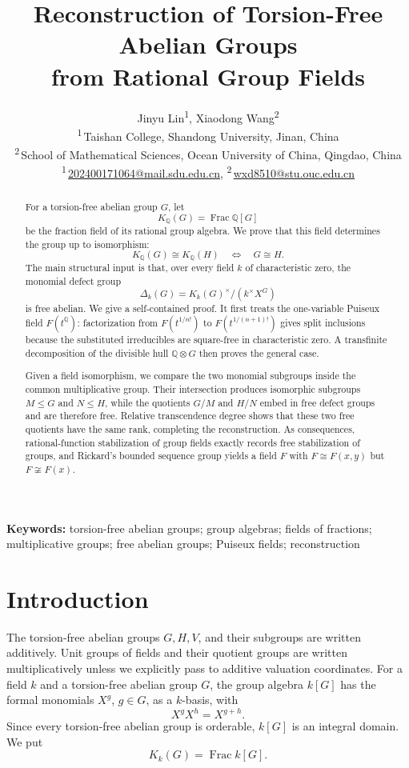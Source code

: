 \documentclass[11pt,a4paper]{article}
\title{\bfseries Reconstruction of Torsion-Free Abelian Groups\\
from Rational Group Fields}
\author{%
  Jinyu Lin\textsuperscript{1}, Xiaodong Wang\textsuperscript{2}\\[0.55em]
  \small\textsuperscript{1}\,Taishan College, Shandong University, Jinan, China\\
  \small\textsuperscript{2}\,School of Mathematical Sciences,
  Ocean University of China, Qingdao, China\\[0.25em]
  \small\textsuperscript{1}\,\href{mailto:202400171064@mail.sdu.edu.cn}{202400171064@mail.sdu.edu.cn},
  \textsuperscript{2}\,\href{mailto:wxd8510@stu.ouc.edu.cn}{wxd8510@stu.ouc.edu.cn}%
}
\date{}
\numberwithin{equation}{section}
\theoremstyle{plain}
\theoremstyle{definition}
\theoremstyle{remark}
\newcommand{\Q}{\mathbb Q}
\newcommand{\Frac}{\operatorname{Frac}}
\newcommand{\Kk}[1]{K_k(#1)}
\newcommand{\mon}[1]{X^{#1}}
\begin{document}
\maketitle

\begin{abstract}
For a torsion-free abelian group $G$, let
\[
  K_{\Q}(G)=\Frac \Q[G]
\]
be the fraction field of its rational group algebra.  We prove that this
field determines the group up to isomorphism:
\[
  K_{\Q}(G)\cong K_{\Q}(H) \quad\Longleftrightarrow\quad G\cong H.
\]
The main structural input is that, over every field $k$ of characteristic
zero, the monomial defect group
\[
  \Delta_k(G)=K_k(G)^\times/(k^\times X^G)
\]
is free abelian.  We give a self-contained proof.  It first treats the
one-variable Puiseux field $F(t^{\Q})$: factorization from
$F(t^{1/n!})$ to $F(t^{1/(n+1)!})$ gives split inclusions because the
substituted irreducibles are square-free in characteristic zero.  A
transfinite decomposition of the divisible hull $\Q\otimes G$ then proves
the general case.

Given a field isomorphism, we compare the two monomial subgroups inside the
common multiplicative group.  Their intersection produces isomorphic
subgroups $M\leq G$ and $N\leq H$, while the quotients $G/M$ and $H/N$
embed in free defect groups and are therefore free.  Relative transcendence
degree shows that these two free quotients have the same rank, completing the
reconstruction.  As consequences, rational-function stabilization of group
fields exactly records free stabilization of groups, and Rickard's bounded
sequence group yields a field $F$ with $F\cong F(x,y)$ but
$F\not\cong F(x)$.
\end{abstract}

\noindent\textbf{Keywords:} torsion-free abelian groups; group algebras;
fields of fractions; multiplicative groups; free abelian groups; Puiseux
fields; reconstruction

\section{Introduction}

The torsion-free abelian groups $G,H,V$, and their subgroups are written
additively.  Unit groups of fields and their quotient groups are written
multiplicatively unless we explicitly pass to additive valuation coordinates.
For a field $k$ and a torsion-free abelian group $G$, the group algebra $k[G]$ has the formal
monomials $\mon g$, $g\in G$, as a $k$-basis, with
\[
  \mon g\mon h=\mon{g+h}.
\]
Since every torsion-free abelian group is orderable, $k[G]$ is an integral
domain.  We put
\[
  \Kk G=\Frac k[G].
\]
\end{document}
